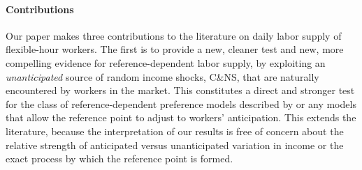 \documentclass[reviewmode,AEJ]{AEA}
\begin{document}

\paragraph{Contributions} 
Our paper makes three contributions to the literature on daily labor supply 
of flexible-hour workers. The first is to provide a new, cleaner test 
and new, more compelling evidence for reference-dependent labor supply, 
by exploiting an \textit{unanticipated} source of random income shocks, C\&NS, that are naturally encountered by workers
in the market. This constitutes a direct and stronger test for the
class of reference-dependent preference models described by \citet{kHoszegi2006model} or any models that 
allow the reference point to adjust to workers' anticipation. This extends the literature, because the
interpretation of our results is free of concern about the relative strength of anticipated versus 
unanticipated variation in income or the exact process by which the reference point is formed.
\end{document}
